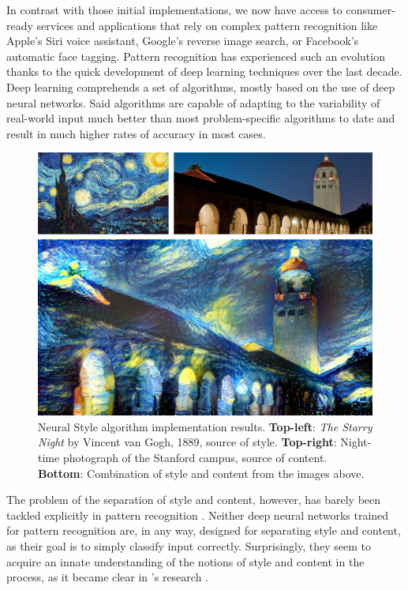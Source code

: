 In contrast with those initial implementations, we now have access to consumer-ready services and applications that rely on complex pattern recognition like Apple's Siri voice assistant, Google's reverse image search, or Facebook's automatic face tagging.
Pattern recognition has experienced such an evolution thanks to the quick development of deep learning techniques over the last decade.
Deep learning comprehends a set of algorithms, mostly based on the use of deep neural networks.
Said algorithms are capable of adapting to the variability of real-world input much better than most problem-specific algorithms to date and result in much higher rates of accuracy in most cases.

\begin{figure}[t]
  \includegraphics[width=\textwidth]{gfx/neural-style-composed}
  \caption{
  Neural Style algorithm implementation \cite{Johnson2015} results.
  \textbf{Top-left}: \textit{The Starry Night} by Vincent van Gogh, 1889, source of style.
  \textbf{Top-right}: Night-time photograph of the Stanford campus, source of content.
  \textbf{Bottom}: Combination of style and content from the images above.
  }
  \label{fig:sec:intro:neural-style}
\end{figure}

The problem of the separation of style and content, however, has barely been tackled explicitly in pattern recognition \cite{Karayev2014}.
Neither deep neural networks trained for pattern recognition are, in any way, designed for separating style and content, as their goal is to simply classify input correctly.
Surprisingly, they seem to acquire an innate understanding of the notions of style and content in the process, as it became clear in \citeauthor{Gatys2015B}'s research \cite{Gatys2015B}.

